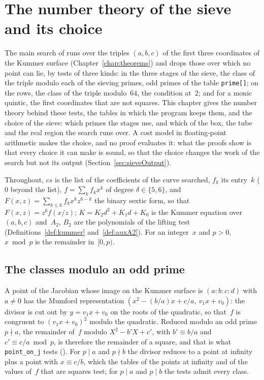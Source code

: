 \chapter{The number theory of the sieve and its choice}\label{chap:sieve-numbers}

The main search of \jpoints{} runs over the triples $(a, b, c)$ of the first three coordinates of
the Kummer surface (Chapter~\ref{chap:theorems}) and drops those over which no point can lie, by
tests of three kinds: in the three stages of the sieve, the class of the triple modulo each of the
sieving primes, odd primes of the table \texttt{prime[]}; on the rows, the class of the triple
modulo~$64$, the condition at~$2$; and for a monic quintic, the first coordinates that are not
squares. This chapter gives the number theory behind these tests, the tables in which the program
keeps them, and the choice of the sieve: which primes the stages use, and which of the box, the tube
and the real region the search runs over. A cost model in floating-point arithmetic makes the
choice, and no proof evaluates it: what the proofs show is that every choice it can make is sound,
so that the choice changes the work of the search but not its output
(Section~\ref{sec:sieveOutput}).

Throughout, $\mathit{cs}$ is the list of the coefficients of the curve searched, $f_k$ its entry~$k$
($0$ beyond the list), $f = \sum_k f_k x^k$ of degree $\delta \in \{5, 6\}$, and
$F(x, z) = \sum_{k \le 6} f_k x^k z^{6 - k}$ the binary sextic form, so that
$F(x, z) = z^6 f(x / z)$; $K = K_2 d^2 + K_1 d + K_0$ is the Kummer equation over $(a, b, c)$
and~$A_2$, $B_2$ are the polynomials of the lifting test (Definitions~\ref{def:kummer}
and~\ref{def:auxA2}). For an integer~$x$ and $p > 0$, $x \bmod p$ is the remainder in~$[0, p)$.

\section{The classes modulo an odd prime}\label{sec:sieveClasses}

A point of the Jacobian whose image on the Kummer surface is $(a : b : c : d)$ with $a \ne 0$ has
the Mumford representation $(x^2 - (b/a) x + c/a,\ v_1 x + v_0)$: the divisor is cut out by
$y = v_1 x + v_0$ on the roots of the quadratic, so that~$f$ is congruent to $(v_1 x + v_0)^2$
modulo the quadratic. Reduced modulo an odd prime $p \nmid a$, the remainder of~$f$ modulo
$X^2 - b' X + c'$, with $b' \equiv b/a$ and $c' \equiv c/a \bmod p$, is therefore the remainder of a
square, and that is what \texttt{point\_on\_j} tests (). For
$p \mid a$ and $p \nmid b$ the divisor reduces to a point at infinity plus a point with
$x \equiv c/b$, which the tables of the points at infinity and of the values of~$f$ that are squares
test; for $p \mid a$ and $p \mid b$ the tests admit every class.

